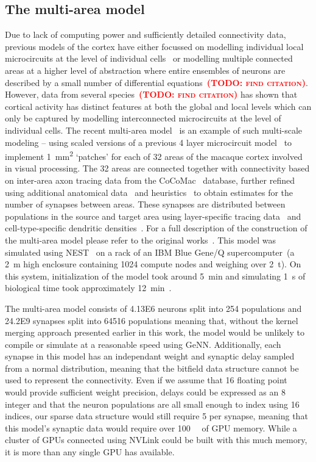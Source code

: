 \documentclass[9pt,twocolumn,twoside,lineno]{pnas-new}
\newcommand{\todo}[1]{\textbf{\textsc{\textcolor{red}{(TODO: #1)}}}}
\begin{document}
\subsection*{The multi-area model}
Due to lack of computing power and sufficiently detailed connectivity data, previous models of the cortex have either focussed on modelling individual local microcircuits at the level of individual cells~\citep{Izhikevich2008,Potjans2012} or modelling multiple connected areas at a higher level of abstraction where entire ensembles of neurons are described by a small number of differential equations~\todo{find citation}.
However, data from several species~\todo{find citation} has shown that cortical activity has distinct features at both the global and local levels which can only be captured by modelling interconnected microcircuits at the level of individual cells.
The recent multi-area model~\citep{Schmidt2018a,Schmidt2018} is an example of such multi-scale modeling -- using scaled versions of a previous 4 layer microcircuit model~\citep{Potjans2012} to implement \SI{1}{\milli\meter\squared} `patches' for each of 32 areas of the macaque cortex involved in visual processing.
The 32 areas are connected together with connectivity based on inter-area axon tracing data from the CoCoMac~\citep{Bakker2012} database, further refined using additional anatomical data~\citep{Markov2014} and heuristics~\citep{Ercsey-Ravasz2013} to obtain estimates for the number of synapses between areas.
These synapses are distributed between populations in the source and target area using layer-specific tracing data~\citep{Markov2014b} and cell-type-specific dendritic densities~\citep{Binzegger2004}.
For a full description of the construction of the multi-area model please refer to the original works~\citep{Schmidt2018a,Schmidt2018}.
This model was simulated using NEST~\citep{Gewaltig2007} on a rack of an IBM Blue Gene/Q supercomputer~(a \SI{2}{\metre} high enclosure containing \num{1024} compute nodes and weighing over \SI{2}{\tonne}).
On this system, initialization of the model took around \SI{5}{\minute} and simulating \SI{1}{\second} of biological time took approximately \SI{12}{\minute}~\citep{Schmidt2018}.

The multi-area model consists of \num{4.13E6} neurons split into \num{254} populations and \num{24.2E9} synapses split into \num{64516} populations meaning that, without the kernel merging approach presented earlier in this work, the model would be unlikely to compile or simulate at a reasonable speed using GeNN.
Additionally, each synapse in this model has an independant weight and synaptic delay sampled from a normal distribution, meaning that the bitfield data structure cannot be used to represent the connectivity.
Even if we assume that \SI{16}{\bit} floating point would provide sufficient weight precision, delays could be expressed as an \SI{8}{\bit} integer and that the neuron populations are all small enough to index using \SI{16}{\bit} indices, our sparse data structure would still require \SI{5}{\byte} per synapse, meaning that this model's synaptic data would require over \SI{100}{\giga\byte} of GPU memory.
While a cluster of GPUs connected using NVLink could be built with this much memory, it is more than any single GPU has available.
\end{document}
